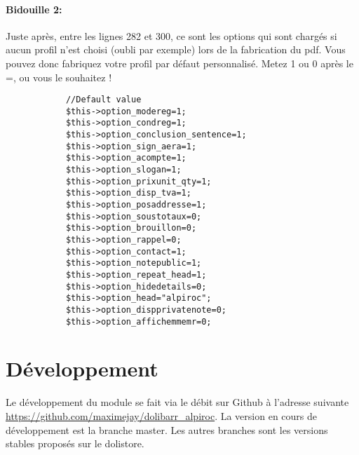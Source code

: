 \documentclass[a4paper,11pt]{article}
\begin{document}
\paragraph{Bidouille 2:\\}

Juste après, entre les lignes 282 et 300, ce sont les options qui sont chargés si aucun profil n'est choisi (oubli par exemple) lors de la fabrication du pdf. Vous pouvez donc fabriquez votre profil par défaut personnalisé. Metez 1 ou 0 après le =, ou vous le souhaitez !

\begin{verbatim}
  			//Default value
			$this->option_modereg=1;
			$this->option_condreg=1;
			$this->option_conclusion_sentence=1;
			$this->option_sign_aera=1;
			$this->option_acompte=1;
			$this->option_slogan=1;
			$this->option_prixunit_qty=1;
			$this->option_disp_tva=1;
			$this->option_posaddresse=1;
			$this->option_soustotaux=0;
			$this->option_brouillon=0;
			$this->option_rappel=0;
			$this->option_contact=1;
			$this->option_notepublic=1;
			$this->option_repeat_head=1;
			$this->option_hidedetails=0;
			$this->option_head="alpiroc";
			$this->option_dispprivatenote=0;
			$this->option_affichemmemr=0;
\end{verbatim}


\section{Développement}
Le développement du module se fait via le débit sur Github à l'adresse suivante \url{https://github.com/maximejay/dolibarr\_alpiroc}.
La version en cours de développement est la branche master. Les autres branches sont les versions stables proposés sur le dolistore.



\end{document}
